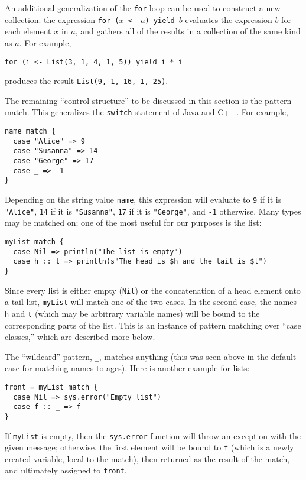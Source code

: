 An additional generalization of the \texttt{for} loop can be used to construct a new collection: the expression \texttt{for ($x$ <- $a$) yield $b$} evaluates the expression $b$ for each element $x$ in $a$, and gathers all of the results in a collection of the same kind as $a$. For example,
\begin{verbatim}
for (i <- List(3, 1, 4, 1, 5)) yield i * i
\end{verbatim}
produces the result \texttt{List(9, 1, 16, 1, 25)}.

The remaining ``control structure'' to be discussed in this section is the pattern match. This generalizes the \texttt{switch} statement of Java and C++. For example,
\begin{verbatim}
name match {
  case "Alice" => 9
  case "Susanna" => 14
  case "George" => 17
  case _ => -1
}
\end{verbatim}
Depending on the string value \texttt{name}, this expression will evaluate to \texttt{9} if it is \texttt{"Alice"}, \texttt{14} if it is \texttt{"Susanna"}, \texttt{17} if it is \texttt{"George"}, and \texttt{-1} otherwise. Many types may be matched on; one of the most useful for our purposes is the list:
\begin{verbatim}
myList match {
  case Nil => println("The list is empty")
  case h :: t => println(s"The head is $h and the tail is $t")
}
\end{verbatim}
Since every list is either empty (\texttt{Nil}) or the concatenation of a head element onto a tail list, \texttt{myList} will match one of the two cases. In the second case, the names \texttt{h} and \texttt{t} (which may be arbitrary variable names) will be bound to the corresponding parts of the list. This is an instance of pattern matching over ``case classes,'' which are described more below.

The ``wildcard'' pattern, \verb|_|, matches anything (this was seen above in the default case for matching names to ages). Here is another example for lists:
\begin{verbatim}
front = myList match {
  case Nil => sys.error("Empty list")
  case f :: _ => f
}
\end{verbatim}
If \texttt{myList} is empty, then the \texttt{sys.error} function will throw an exception with the given message; otherwise, the first element will be bound to \texttt{f} (which is a newly created variable, local to the match), then returned as the result of the match, and ultimately assigned to \texttt{front}.

